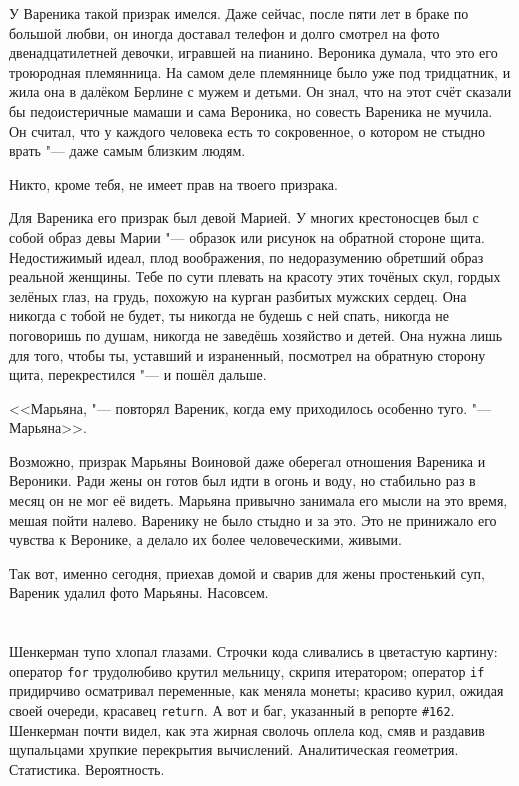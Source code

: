 У Вареника такой призрак имелся.
Даже сейчас, после пяти лет в браке по большой любви, он иногда доставал телефон и долго смотрел на фото двенадцатилетней девочки, игравшей на пианино.
Вероника думала, что это его троюродная племянница.
На самом деле племяннице было уже под тридцатник, и жила она в далёком Берлине с мужем и детьми.
Он знал, что на этот счёт сказали бы педоистеричные мамаши и сама Вероника, но совесть Вареника не мучила.
Он считал, что у каждого человека есть то сокровенное, о котором не стыдно врать "--- даже самым близким людям.

Никто, кроме тебя, не имеет прав на твоего призрака.

Для Вареника его призрак был девой Марией.
У многих крестоносцев был с собой образ девы Марии "--- образок или рисунок на обратной стороне щита.
Недостижимый идеал, плод воображения, по недоразумению обретший образ реальной женщины.
Тебе по сути плевать на красоту этих точёных скул, гордых зелёных глаз, на грудь, похожую на курган разбитых мужских сердец.
Она никогда с тобой не будет, ты никогда не будешь с ней спать, никогда не поговоришь по душам, никогда не заведёшь хозяйство и детей.
Она нужна лишь для того, чтобы ты, уставший и израненный, посмотрел на обратную сторону щита, перекрестился "--- и пошёл дальше.

<<Марьяна, "--- повторял Вареник, когда ему приходилось особенно туго.
"--- Марьяна>>.

Возможно, призрак Марьяны Воиновой даже оберегал отношения Вареника и Вероники.
Ради жены он готов был идти в огонь и воду, но стабильно раз в месяц он не мог её видеть.
Марьяна привычно занимала его мысли на это время, мешая пойти налево.
Варенику не было стыдно и за это.
Это не принижало его чувства к Веронике, а делало их более человеческими, живыми.

Так вот, именно сегодня, приехав домой и сварив для жены простенький суп, Вареник удалил фото Марьяны.
Насовсем.

\chapter{}

\textspace

\label{Sat_2012_07_07}

Шенкерман тупо хлопал глазами.
Строчки кода сливались в цветастую картину: оператор \texttt{\small{for}} трудолюбиво крутил мельницу, скрипя итератором;
оператор \texttt{\small{if}} придирчиво осматривал переменные, как меняла монеты;
красиво курил, ожидая своей очереди, красавец \texttt{\small{return}}.
А вот и баг, указанный в репорте \texttt{\small{\#162}}.
Шенкерман почти видел, как эта жирная сволочь оплела код, смяв и раздавив щупальцами хрупкие перекрытия вычислений.
Аналитическая геометрия.
Статистика.
Вероятность.

